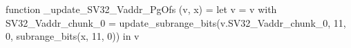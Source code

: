 function _update_SV32_Vaddr_PgOfs (v, x) = let v = { v with SV32_Vaddr_chunk_0 = update_subrange_bits(v.SV32_Vaddr_chunk_0, 11, 0, subrange_bits(x, 11, 0)) } in
  v
